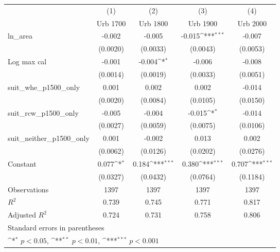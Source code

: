{
\def\sym#1{\ifmmode^{#1}\else\(^{#1}\)\fi}
\begin{tabular}{l*{4}{c}}
\toprule
                    &\multicolumn{1}{c}{(1)}&\multicolumn{1}{c}{(2)}&\multicolumn{1}{c}{(3)}&\multicolumn{1}{c}{(4)}\\
                    &\multicolumn{1}{c}{Urb 1700}&\multicolumn{1}{c}{Urb 1800}&\multicolumn{1}{c}{Urb 1900}&\multicolumn{1}{c}{Urb 2000}\\
\midrule
ln\_area             &      -0.002         &      -0.005         &      -0.015\sym{***}&      -0.007         \\
                    &    (0.0020)         &    (0.0033)         &    (0.0043)         &    (0.0053)         \\
\addlinespace
Log max cal         &      -0.001         &      -0.004\sym{*}  &      -0.006         &      -0.008         \\
                    &    (0.0014)         &    (0.0019)         &    (0.0033)         &    (0.0051)         \\
\addlinespace
suit\_whe\_p1500\_only &       0.001         &       0.002         &       0.002         &      -0.014         \\
                    &    (0.0020)         &    (0.0084)         &    (0.0105)         &    (0.0150)         \\
\addlinespace
suit\_rcw\_p1500\_only &      -0.005         &      -0.004         &      -0.015\sym{*}  &      -0.014         \\
                    &    (0.0027)         &    (0.0059)         &    (0.0075)         &    (0.0106)         \\
\addlinespace
suit\_neither\_p1500\_only&       0.001         &      -0.002         &       0.013         &       0.002         \\
                    &    (0.0062)         &    (0.0126)         &    (0.0202)         &    (0.0276)         \\
\addlinespace
Constant            &       0.077\sym{*}  &       0.184\sym{***}&       0.380\sym{***}&       0.707\sym{***}\\
                    &    (0.0327)         &    (0.0432)         &    (0.0764)         &    (0.1184)         \\
\midrule
Observations        &        1397         &        1397         &        1397         &        1397         \\
\(R^{2}\)           &       0.739         &       0.745         &       0.771         &       0.817         \\
Adjusted \(R^{2}\)  &       0.724         &       0.731         &       0.758         &       0.806         \\
\bottomrule
\multicolumn{5}{l}{\footnotesize Standard errors in parentheses}\\
\multicolumn{5}{l}{\footnotesize \sym{*} \(p<0.05\), \sym{**} \(p<0.01\), \sym{***} \(p<0.001\)}\\
\end{tabular}
}
